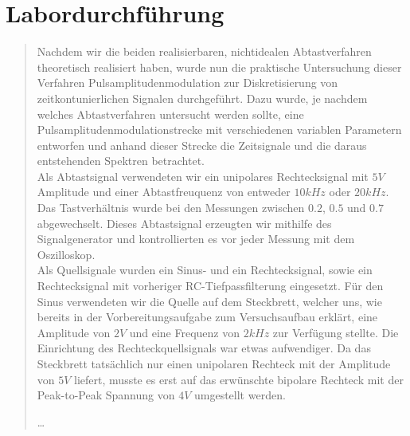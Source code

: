 
    
    \section{Labordurchführung}
    \begin{quote}
         
         Nachdem wir die beiden realisierbaren, nichtidealen Abtastverfahren
         theoretisch realisiert haben, wurde nun die praktische Untersuchung
         dieser Verfahren Pulsamplitudenmodulation zur Diskretisierung von
         zeitkontunierlichen Signalen durchgeführt. Dazu wurde, je nachdem
         welches Abtastverfahren untersucht werden sollte, eine
         Pulsamplitudenmodulationstrecke mit verschiedenen variablen Parametern
         entworfen und anhand dieser Strecke die Zeitsignale und die daraus
         entstehenden Spektren betrachtet.\\
         
         Als Abtastsignal verwendeten wir ein unipolares Rechtecksignal mit $5V$
         Amplitude und einer Abtastfreuquenz von entweder $10 kHz$ oder $20
         kHz$. Das Tastverhältnis wurde bei den Messungen zwischen $0.2$, $0.5$
         und $0.7$ abgewechselt. Dieses Abtastsignal erzeugten wir mithilfe des
         Signalgenerator und kontrollierten es vor jeder Messung mit dem
         Oszilloskop.\\
         
         Als Quellsignale wurden ein Sinus- und ein Rechtecksignal, sowie ein
         Rechtecksignal mit vorheriger RC-Tiefpassfilterung eingesetzt. Für den
         Sinus verwendeten wir die Quelle auf dem Steckbrett, welcher uns, wie
         bereits in der Vorbereitungsaufgabe zum Versuchsaufbau erklärt, eine
         Amplitude von $2V$ und eine Frequenz von $2 kHz$ zur Verfügung stellte. 
         Die Einrichtung des Rechteckquellsignals war etwas aufwendiger. Da das
         Steckbrett tatsächlich nur einen unipolaren Rechteck mit der Amplitude
         von $5V$ liefert, musste es erst auf das erwünschte bipolare Rechteck
         mit der Peak-to-Peak Spannung von $4V$ umgestellt werden.
         
         \ldots
         
         
   	\end{quote}%


